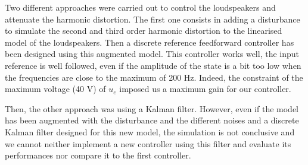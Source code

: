 Two different approaches were carried out to control the loudspeakers and attenuate the harmonic distortion. The first one consists in adding a disturbance to simulate the second and third order harmonic distortion to the linearised model of the loudspeakers. Then a discrete reference feedforward controller has been designed using this augmented model. This controller works well, the input reference is well followed, even if the amplitude of the state is a bit too low when the frequencies are close to the maximum of 200 Hz. Indeed, the constraint of the maximum voltage (40 V) of $u_e$ imposed us a maximum gain for our controller.

Then, the other approach was using a Kalman filter. However, even if the model has been augmented with the disturbance and the different noises and a discrete Kalman filter designed for this new model, the simulation is not conclusive and we cannot neither implement a new controller using this filter and evaluate its performances nor compare it to the first controller.